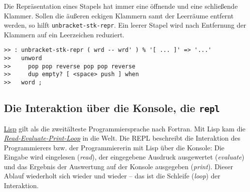 Die Repräsentation eines Stapels hat immer eine öffnende und eine schließende Klammer. Sollen die äußeren eckigen Klammern samt der Leer\-räu\-me entfernt werden, so hilft \verb|unbracket-stk-repr|. Ein leerer Stapel wird nach Entfernung der Klammern auf ein Leerzeichen reduziert.

\begin{verbatim}
>> : unbracket-stk-repr ( wrd -- wrd' ) % '[ ... ]' => '...'
>>   unword
>>     pop pop reverse pop pop reverse
>>     dup empty? [ <space> push ] when
>>   word ;
\end{verbatim}


  


\subsection{Die Interaktion über die Konsole, die \texttt{repl}}

\href{http://de.wikipedia.org/wiki/Lisp}{Lisp} gilt als die zweitälteste Programmiersprache nach Fortran. Mit Lisp kam die \href{http://en.wikipedia.org/wiki/Read\%E2\%80\%93eval\%E2\%80\%93print_loop}{\emph{Read-Evaluate-Print-Loop}} in die Welt. Die REPL beschreibt die Interaktion des Programmierers bzw. der Programmiererin mit Lisp über die Konsole: Die Eingabe wird eingelesen (\emph{read}), der eingegebene Ausdruck ausgewertet (\emph{evaluate}) und das Ergebnis der Auswertung auf der Konsole ausgegeben (\emph{print}). Dieser Ablauf wiederholt sich wieder und wieder -- das ist die Schleife (\emph{loop}) der Interaktion.

